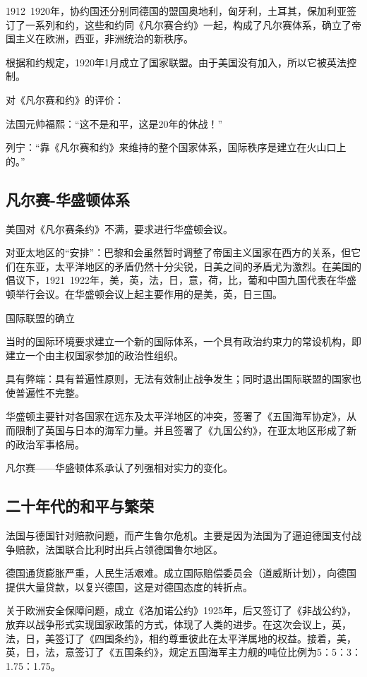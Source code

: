 1912~1920年，协约国还分别同德国的盟国奥地利，匈牙利，土耳其，保加利亚签订了一系列和约，这些和约同《凡尔赛合约》一起，构成了凡尔赛体系，确立了帝国主义在欧洲，西亚，非洲统治的新秩序。

根据和约规定，1920年1月成立了国家联盟。由于美国没有加入，所以它被英法控制。

对《凡尔赛和约》的评价：

法国元帅福熙：“这不是和平，这是20年的休战！”

列宁：“靠《凡尔赛和约》来维持的整个国家体系，国际秩序是建立在火山口上的。”

\subsection{凡尔赛-华盛顿体系}
美国对《凡尔赛条约》不满，要求进行华盛顿会议。

对亚太地区的“安排”：巴黎和会虽然暂时调整了帝国主义国家在西方的关系，但它们在东亚，太平洋地区的矛盾仍然十分尖锐，日美之间的矛盾尤为激烈。在美国的倡议下，1921~1922年，美，英，法，日，意，荷，比，葡和中国九国代表在华盛顿举行会议。在华盛顿会议上起主要作用的是美，英，日三国。

国际联盟的确立

当时的国际环境要求建立一个新的国际体系，一个具有政治约束力的常设机构，即建立一个由主权国家参加的政治性组织。

具有弊端：具有普遍性原则，无法有效制止战争发生；同时退出国际联盟的国家也使普遍性不完整。

华盛顿主要针对各国家在远东及太平洋地区的冲突，签署了《五国海军协定》，从而限制了英国与日本的海军力量。并且签署了《九国公约》，在亚太地区形成了新的政治军事格局。

凡尔赛——华盛顿体系承认了列强相对实力的变化。

\subsection{二十年代的和平与繁荣}
法国与德国针对赔款问题，而产生鲁尔危机。主要是因为法国为了逼迫德国支付战争赔款，法国联合比利时出兵占领德国鲁尔地区。

德国通货膨胀严重，人民生活艰难。成立国际赔偿委员会（道威斯计划），向德国提供大量贷款，以复兴德国，这是对德国态度的转折点。

关于欧洲安全保障问题，成立《洛加诺公约》1925年，后又签订了《非战公约》，放弃以战争形式实现国家政策的方式，体现了人类的进步。在这次会议上，英，法，日，美签订了《四国条约》，相约尊重彼此在太平洋属地的权益。接着，美，英，日，法，意签订了《五国条约》，规定五国海军主力舰的吨位比例为5：5：3：1.75：1.75。

